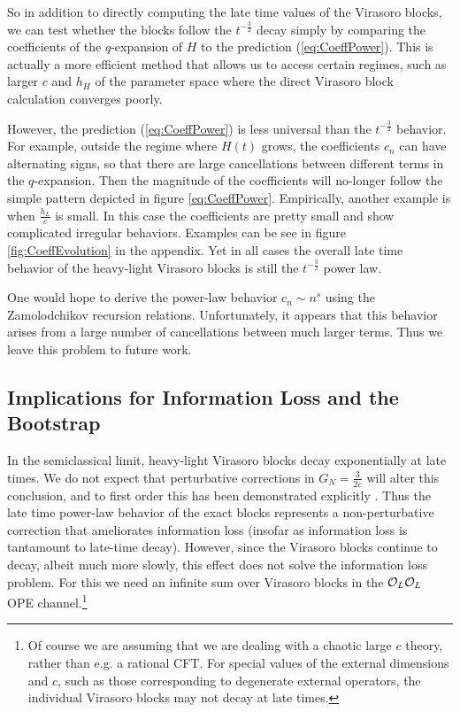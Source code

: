 \documentclass[12pt]{article}
\numberwithin{equation}{section}
\newcommand{\CO}{{\cal O}}
\begin{document}
So in addition to directly computing the late time values of the Virasoro blocks, we can test whether the blocks follow the $t^{-\frac{3}{2}}$ decay simply by comparing the coefficients of the $q$-expansion of $H$ to the prediction (\ref{eq:CoeffPower}). This is actually a more efficient method that allows us to access certain regimes, such as larger $c$ and $h_H$ of the parameter space where the direct Virasoro block calculation converges poorly. 

 However, the prediction (\ref{eq:CoeffPower}) is less universal than the $t^{-\frac{3}{2}}$  behavior.  For example, outside the regime where $H(t)$ grows, the coefficients $c_n$ can have alternating signs, so that there are  large cancellations between different terms in the $q$-expansion.  Then the magnitude of the coefficients will no-longer follow the simple pattern depicted in figure \ref{eq:CoeffPower}.  Empirically, another example is when $\frac{h_L}{c}$ is small. In this case the coefficients are pretty small and show complicated irregular behaviors. Examples can be see in figure \ref{fig:CoeffEvolution} in the appendix. Yet in all cases the overall late time behavior of the heavy-light Virasoro blocks is still the $t^{-\frac{3}{2}}$ power law.  

One would hope to derive the power-law behavior $c_n \sim n^s$ using the Zamolodchikov recursion relations.  Unfortunately, it appears that this behavior arises from a large number of cancellations between much larger terms.  Thus we leave this problem to future work. 



\subsection{Implications for Information Loss and the Bootstrap}

In the semiclassical limit, heavy-light Virasoro blocks decay exponentially at late times.  We do not expect that perturbative corrections in $G_N = \frac{3}{2c}$ will alter this conclusion, and to first order this has been demonstrated explicitly \cite{Fitzpatrick:2015dlt}.  Thus the late time power-law behavior of the exact blocks represents a non-perturbative correction that ameliorates information loss (insofar as information loss is tantamount to late-time decay).  However, since the Virasoro blocks continue to decay, albeit much more slowly, this effect does not solve the information loss problem.  For this we need an infinite sum over Virasoro blocks in the $\CO_L \CO_L$ OPE channel.\footnote{Of course we are assuming that we are dealing with a chaotic large $c$ theory, rather than e.g. a rational CFT.  For special values of the external dimensions and $c$, such as those corresponding to degenerate external operators, the individual Virasoro blocks may not decay at late times.}  
\end{document}
